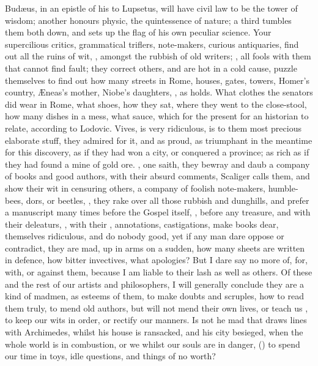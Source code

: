 Bud\ae{}us, in an epistle of his to Lupsetus, will have civil law to be
the tower of wisdom; another honours physic, the quintessence of
nature; a third tumbles them both down, and sets up the flag of his own
peculiar science. Your supercilious critics, grammatical triflers,
note-makers, curious antiquaries, find out all the ruins of wit,
, amongst the rubbish of old writers; , all fools with them that cannot find fault;
they correct others, and are hot in a cold cause, puzzle themselves to
find out how many streets in Rome, houses, gates, towers, Homer's
country, \AE{}neas's mother, Niobe's daughters,  , as \Seneca holds. What clothes the
senators did wear in Rome, what shoes, how they sat, where they went to
the close-stool, how many dishes in a mess, what sauce, which for the
present for an historian to relate, according to Lodovic. Vives,
is very ridiculous, is to them most precious elaborate stuff, they
admired for it, and as proud, as triumphant in the meantime for this
discovery, as if they had won a city, or conquered a province; as rich
as if they had found a mine of gold ore. , one saith, they bewray and daub
a company of books and good authors, with their absurd comments,
 Scaliger calls them, and show their wit
in censuring others, a company of foolish note-makers, humble-bees,
dors, or beetles, , they rake over
all those rubbish and dunghills, and prefer a manuscript many times
before the Gospel itself, , before any treasure,
and with their deleaturs, , with
their , annotations, castigations, \etc{} make books
dear, themselves ridiculous, and do nobody good, yet if any man dare
oppose or contradict, they are mad, up in arms on a sudden, how many
sheets are written in defence, how bitter invectives, what apologies?
 But I dare say no more of,
for, with, or against them, because I am liable to their lash as well
as others. Of these and the rest of our artists and philosophers, I
will generally conclude they are a kind of madmen, as  \Seneca
esteems of them, to make doubts and scruples, how to read them truly,
to mend old authors, but will not mend their own lives, or teach us
, to keep our wits in order, or rectify our manners.  Is not he mad that
draws lines with Archimedes, whilst his house is ransacked, and his
city besieged, when the whole world is in combustion, or we whilst our
souls are in danger, () to spend our time in
toys, idle questions, and things of no worth?

